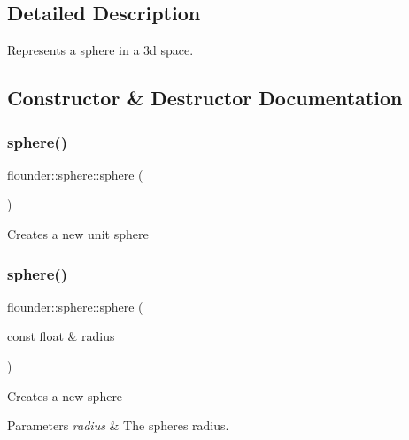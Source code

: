 \subsection{Detailed Description}
Represents a sphere in a 3d space. 



\subsection{Constructor \& Destructor Documentation}
\mbox{\label{classflounder_1_1sphere_a99e656a77996015079eb9744db5d7330}} 
\subsubsection{\texorpdfstring{sphere()}{sphere()}\hspace{0.1cm}{\footnotesize\ttfamily [1/4]}}
{\footnotesize\ttfamily flounder\+::sphere\+::sphere (\begin{DoxyParamCaption}{ }\end{DoxyParamCaption})}



Creates a new unit sphere 

\mbox{\label{classflounder_1_1sphere_ad6598fc632cabc8a516cef89f1f0cae9}} 
\subsubsection{\texorpdfstring{sphere()}{sphere()}\hspace{0.1cm}{\footnotesize\ttfamily [2/4]}}
{\footnotesize\ttfamily flounder\+::sphere\+::sphere (\begin{DoxyParamCaption}\item[{const float \&}]{radius }\end{DoxyParamCaption})}



Creates a new sphere 


\begin{DoxyParams}{Parameters}
{\em radius} & The spheres radius. \\
\hline
\end{DoxyParams}
\mbox{\label{classflounder_1_1sphere_a760cbc4b1b1dc51e47813b4c0d0b489d}} 
